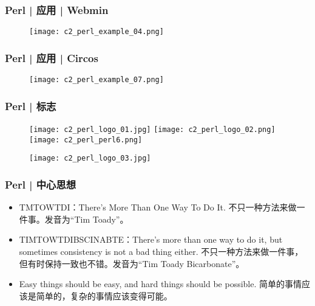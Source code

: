 \begin{frame}
  \frametitle{Perl | 应用 | Webmin}
  \begin{figure}
    \centering
    \texttt{[image: c2\_perl\_example\_04.png]}
  \end{figure}
\end{frame}

\begin{frame}
  \frametitle{Perl | 应用 | Circos}
  \begin{figure}
    \centering
    \texttt{[image: c2\_perl\_example\_07.png]}
  \end{figure}
\end{frame}

\begin{frame}
  \frametitle{Perl | 标志}
  \begin{figure}
    \centering
    \texttt{[image: c2\_perl\_logo\_01.jpg]}
    \hspace{0.1cm}
    \texttt{[image: c2\_perl\_logo\_02.png]}
    \hspace{0.1cm}
    \texttt{[image: c2\_perl\_perl6.png]}
  \end{figure}
  \begin{figure}
    \centering
    \texttt{[image: c2\_perl\_logo\_03.jpg]}
  \end{figure}
\end{frame}

\begin{frame}
  \frametitle{Perl | 中心思想}
  \begin{itemize}
    \item \alert{TMTOWTDI}：There's More Than One Way To Do It. 不只一种方法来做一件事。发音为“Tim Toady”。
    \item TIMTOWTDIBSCINABTE：There's more than one way to do it, but sometimes consistency is not a bad thing either.  不只一种方法来做一件事，但有时保持一致也不错。发音为“Tim Toady Bicarbonate”。
    \item Easy things should be easy, and hard things should be possible. 简单的事情应该是简单的，复杂的事情应该变得可能。
  \end{itemize}
\end{frame}

